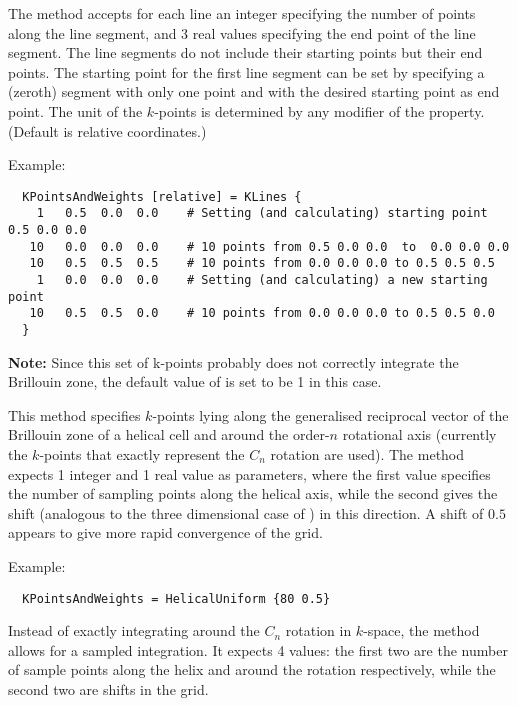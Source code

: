 The  method accepts for each line an integer specifying
the number of points along the line segment, and 3 real values
specifying the end point of the line segment. The line segments do not
include their starting points but their end points. The starting point
for the first line segment can be set by specifying a (zeroth) segment
with only one point and with the desired starting point as end point.
The unit of the $k$-points is determined by any modifier of the
 property. (Default is relative coordinates.)

Example:
\invparskip
\begin{verbatim}
  KPointsAndWeights [relative] = KLines {
    1   0.5  0.0  0.0    # Setting (and calculating) starting point 0.5 0.0 0.0
   10   0.0  0.0  0.0    # 10 points from 0.5 0.0 0.0  to  0.0 0.0 0.0
   10   0.5  0.5  0.5    # 10 points from 0.0 0.0 0.0 to 0.5 0.5 0.5
    1   0.0  0.0  0.0    # Setting (and calculating) a new starting point
   10   0.5  0.5  0.0    # 10 points from 0.0 0.0 0.0 to 0.5 0.5 0.0
  }
\end{verbatim}

\textbf{Note:} Since this set of k-points probably does not correctly integrate the Brillouin zone,
the default value of  is set to be 1 in this case.


This method specifies $k$-points lying along the generalised reciprocal vector
of the Brillouin zone of a helical cell and around the order-$n$ rotational axis
(currently the $k$-points that exactly represent the $C_n$ rotation are
used). The  method expects 1 integer and 1 real value as
parameters, where the first value specifies the number of sampling points along
the helical axis, while the second gives the shift (analogous to the three
dimensional case of ) in this direction. A shift of $0.5$
appears to give more rapid convergence of the grid.

Example:
\invparskip
\begin{verbatim}
  KPointsAndWeights = HelicalUniform {80 0.5}
\end{verbatim}


Instead of exactly integrating around the $C_n$ rotation in $k$-space, the
 method allows for a sampled integration. It expects 4
values: the first two are the number of sample points along the helix and around
the rotation respectively, while the second two are shifts in the grid.

